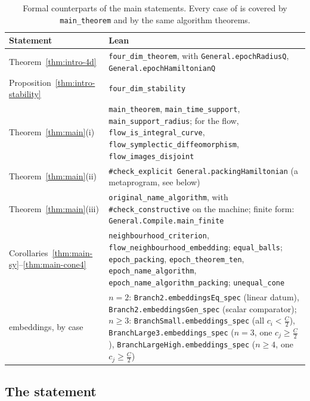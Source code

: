 \begin{table}[ht]
\centering
\footnotesize
\renewcommand{\arraystretch}{1.15}
\begin{tabular}{@{}L{0.2\textwidth}L{0.74\textwidth}@{}}
\toprule
Statement & Lean \\
\midrule
Theorem~\ref{thm:intro-4d} & \texttt{four\_dim\_theorem}, with \texttt{General.epochRadiusQ},
 \texttt{General.epochHamiltonianQ} \\
Proposition~\ref{thm:intro-stability} & \texttt{four\_dim\_stability} \\
Theorem~\ref{thm:main}(i) & \texttt{main\_theorem}, \texttt{main\_time\_support}, \texttt{main\_support\_radius}; for the
 flow, \texttt{flow\_is\_integral\_curve}, \texttt{flow\_symplectic\_diffeomorphism}, \texttt{flow\_images\_disjoint} \\
Theorem~\ref{thm:main}(ii) & \texttt{\#check\_explicit General.packingHamiltonian} (a metaprogram, see below) \\
Theorem~\ref{thm:main}(iii) & \texttt{original\_name\_algorithm}, with \texttt{\#check\_constructive} on the machine;
 finite form: \texttt{General.Compile.main\_finite} \\
Corollaries~\ref{thm:main-sy}--\ref{thm:main-cone4} & \texttt{neighbourhood\_criterion},
 \texttt{flow\_neighbourhood\_embedding}; \texttt{equal\_balls}; \texttt{epoch\_packing}, \texttt{epoch\_theorem\_ten},
 \texttt{epoch\_name\_algorithm}, \texttt{epoch\_name\_algorithm\_packing}; \texttt{unequal\_cone} \\
embeddings, by case & $n=2$: \texttt{Branch2.embeddingsEq\_spec} (linear datum), \texttt{Branch2.embeddingsGen\_spec}
 (scalar comparator); $n\ge3$: \texttt{BranchSmall.embeddings\_spec} (all $c_i<\frac C2$),
 \texttt{BranchLarge3.embeddings\_spec} ($n=3$, one $c_j\ge\frac C2$), \texttt{BranchLargeHigh.embeddings\_spec}
 ($n\ge4$, one $c_j\ge\frac C2$) \\
\bottomrule
\end{tabular}
\caption{Formal counterparts of the main statements. Every case of  is covered
by \texttt{main\_theorem} and by the same algorithm theorems.}
\label{tab:ver-coverage}\label{tab:ver-levels}
\end{table}

\subsection*{The statement}

